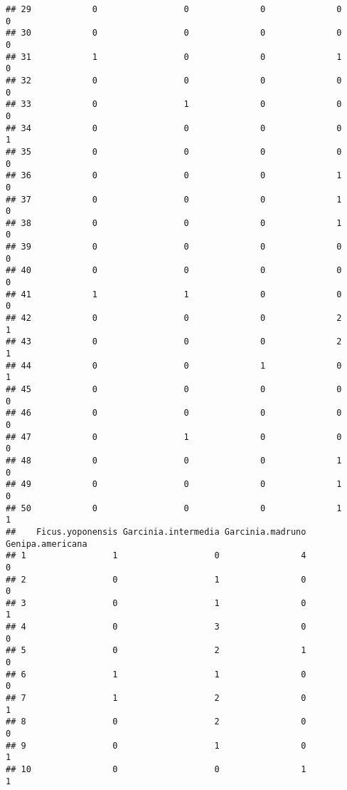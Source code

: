 \documentclass[
]{article}
\begin{document}
\begin{verbatim}
## 29            0                 0              0              0               0
## 30            0                 0              0              0               0
## 31            1                 0              0              1               0
## 32            0                 0              0              0               0
## 33            0                 1              0              0               0
## 34            0                 0              0              0               1
## 35            0                 0              0              0               0
## 36            0                 0              0              1               0
## 37            0                 0              0              1               0
## 38            0                 0              0              1               0
## 39            0                 0              0              0               0
## 40            0                 0              0              0               0
## 41            1                 1              0              0               0
## 42            0                 0              0              2               1
## 43            0                 0              0              2               1
## 44            0                 0              1              0               1
## 45            0                 0              0              0               0
## 46            0                 0              0              0               0
## 47            0                 1              0              0               0
## 48            0                 0              0              1               0
## 49            0                 0              0              1               0
## 50            0                 0              0              1               1
##    Ficus.yoponensis Garcinia.intermedia Garcinia.madruno Genipa.americana
## 1                 1                   0                4                0
## 2                 0                   1                0                0
## 3                 0                   1                0                1
## 4                 0                   3                0                0
## 5                 0                   2                1                0
## 6                 1                   1                0                0
## 7                 1                   2                0                1
## 8                 0                   2                0                0
## 9                 0                   1                0                1
## 10                0                   0                1                1

\end{verbatim}
\end{document}
